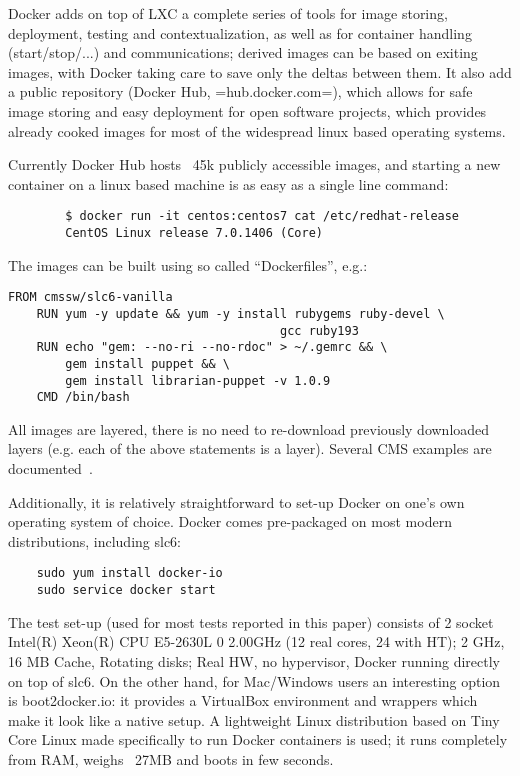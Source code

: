 \documentclass{PoS}
\begin{document}
Docker adds on top of LXC a complete series of tools for image storing, deployment, testing and contextualization, as well as for container handling (start/stop/...) and communications; derived images can be based on exiting images, with Docker taking care to save only the deltas between them. It also add a public repository (Docker Hub, =hub.docker.com=), which allows for safe image storing and easy deployment for open software projects, which provides already cooked images for most of the widespread linux based operating systems.

Currently Docker Hub hosts  ~45k publicly accessible images, and starting a new container on a linux based machine is as easy as a single line command:
%
\begin{verbatim}
        $ docker run -it centos:centos7 cat /etc/redhat-release
        CentOS Linux release 7.0.1406 (Core)
\end{verbatim}
%
The images can be built using so called ``Dockerfiles'', e.g.:
%
\begin{verbatim}
FROM cmssw/slc6-vanilla
    RUN yum -y update && yum -y install rubygems ruby-devel \
                                      gcc ruby193
    RUN echo "gem: --no-ri --no-rdoc" > ~/.gemrc && \
        gem install puppet && \
        gem install librarian-puppet -v 1.0.9
    CMD /bin/bash
\end{verbatim}
%
All images are layered, there is no need to re-download previously downloaded layers (e.g. each of the above statements is a layer). Several CMS examples are documented~\cite{DockerGiulio}.

Additionally, it is relatively straightforward to set-up Docker on one's own operating system of choice. Docker comes pre-packaged on most modern distributions, including slc6:
%
\begin{verbatim}
    sudo yum install docker-io
    sudo service docker start
\end{verbatim}
%
The test set-up (used for most tests reported in this paper) consists of 2 socket Intel(R) Xeon(R) CPU E5-2630L 0 \@ 2.00GHz (12 real cores, 24 with HT); 2 GHz, 16 MB Cache, Rotating disks; Real HW, no hypervisor, Docker running directly on top of slc6. On the other hand, for Mac/Windows users an interesting option is boot2docker.io: it provides a VirtualBox environment and wrappers which make it look like a native setup. A lightweight Linux distribution based on Tiny Core Linux made specifically to run Docker containers is used; it runs completely from RAM, weighs ~27MB and boots in few seconds.
\end{document}
